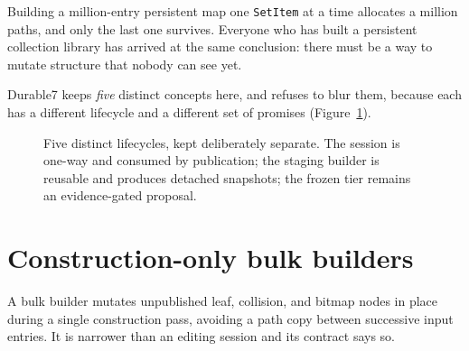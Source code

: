 \documentclass[11pt,twoside,openright]{book}
\newcommand{\code}[1]{\texorpdfstring{\textcolor{d7ink}{\texttt{#1}}}{#1}}
\newcommand{\bigoh}[1]{$\mathrm{O}(#1)$}
\begin{document}
\noindent
Building a million-entry persistent map one \code{SetItem} at a time allocates a
million paths, and only the last one survives. Everyone who has built a
persistent collection library has arrived at the same conclusion: there must be
a way to mutate structure that nobody can see yet.

Durable7 keeps \emph{five} distinct concepts here, and refuses to blur them,
because each has a different lifecycle and a different set of promises
(Figure~\ref{fig:lifecycle}).

\begin{figure}[htbp]
\centering
{}
\caption{Five distinct lifecycles, kept deliberately separate. The session is
one-way and consumed by publication; the staging builder is reusable and
produces detached snapshots; the frozen tier remains an evidence-gated
proposal.}
\label{fig:lifecycle}
\end{figure}

\section{Construction-only bulk builders}

A bulk builder mutates unpublished leaf, collision, and bitmap nodes in place
during a single construction pass, avoiding a path copy between successive
input entries. It is narrower than an editing session and its contract says so.
\end{document}

